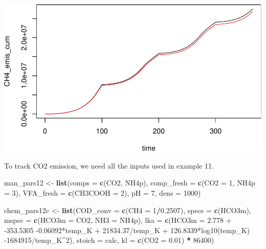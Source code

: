\documentclass[
]{article}
\newenvironment{Shaded}{\begin{snugshade}}{\end{snugshade}}
\newcommand{\AttributeTok}[1]{\textcolor[rgb]{0.13,0.29,0.53}{#1}}
\newcommand{\DecValTok}[1]{\textcolor[rgb]{0.00,0.00,0.81}{#1}}
\newcommand{\FloatTok}[1]{\textcolor[rgb]{0.00,0.00,0.81}{#1}}
\newcommand{\FunctionTok}[1]{\textcolor[rgb]{0.13,0.29,0.53}{\textbf{#1}}}
\newcommand{\NormalTok}[1]{#1}
\newcommand{\OtherTok}[1]{\textcolor[rgb]{0.56,0.35,0.01}{#1}}
\newcommand{\SpecialCharTok}[1]{\textcolor[rgb]{0.81,0.36,0.00}{\textbf{#1}}}
\newcommand{\StringTok}[1]{\textcolor[rgb]{0.31,0.60,0.02}{#1}}
\begin{document}
\includegraphics{simple_demo_files/figure-latex/unnamed-chunk-93-1.pdf}

To track CO2 emission, we need all the inputs used in example 11.

\begin{Shaded}
\begin{Highlighting}[]
\NormalTok{man\_pars12 }\OtherTok{\textless{}{-}} \FunctionTok{list}\NormalTok{(}\AttributeTok{comps =} \FunctionTok{c}\NormalTok{(}\StringTok{\textquotesingle{}CO2\textquotesingle{}}\NormalTok{, }\StringTok{\textquotesingle{}NH4p\textquotesingle{}}\NormalTok{),}
                   \AttributeTok{comp\_fresh =} \FunctionTok{c}\NormalTok{(}\AttributeTok{CO2 =} \DecValTok{1}\NormalTok{, }\AttributeTok{NH4p =} \DecValTok{3}\NormalTok{), }
                   \AttributeTok{VFA\_fresh =} \FunctionTok{c}\NormalTok{(}\AttributeTok{CH3COOH =} \DecValTok{2}\NormalTok{),}
                   \AttributeTok{pH =} \DecValTok{7}\NormalTok{, }\AttributeTok{dens =} \DecValTok{1000}\NormalTok{)}
\end{Highlighting}
\end{Shaded}

\begin{Shaded}
\begin{Highlighting}[]
\NormalTok{chem\_pars12c }\OtherTok{\textless{}{-}} \FunctionTok{list}\NormalTok{(}\AttributeTok{COD\_conv =} \FunctionTok{c}\NormalTok{(}\AttributeTok{CH4 =} \DecValTok{1}\SpecialCharTok{/}\FloatTok{0.2507}\NormalTok{),}
                     \AttributeTok{specs =} \FunctionTok{c}\NormalTok{(}\StringTok{\textquotesingle{}HCO3m\textquotesingle{}}\NormalTok{),}
                     \AttributeTok{mspec =} \FunctionTok{c}\NormalTok{(}\AttributeTok{HCO3m =} \StringTok{\textquotesingle{}CO2\textquotesingle{}}\NormalTok{, }\AttributeTok{NH3 =} \StringTok{\textquotesingle{}NH4p\textquotesingle{}}\NormalTok{),}
                     \AttributeTok{lka =} \FunctionTok{c}\NormalTok{(}\AttributeTok{HCO3m =} \StringTok{\textquotesingle{}{-}2.778 + {-}353.5305 {-}0.06092*temp\_K + 21834.37/temp\_K + 126.8339*log10(temp\_K) {-}1684915/temp\_K\^{}2\textquotesingle{}}\NormalTok{),}
                     \AttributeTok{stoich =} \StringTok{\textquotesingle{}calc\textquotesingle{}}\NormalTok{,}
                     \AttributeTok{kl =} \FunctionTok{c}\NormalTok{(}\AttributeTok{CO2 =} \FloatTok{0.01}\NormalTok{) }\SpecialCharTok{*} \DecValTok{86400}\NormalTok{)}
\end{Highlighting}
\end{Shaded}
\end{document}
